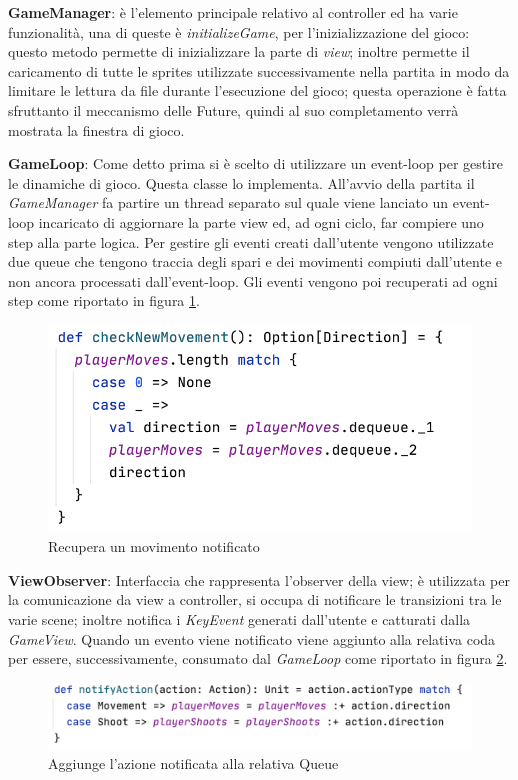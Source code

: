  \textbf{GameManager}: è l'elemento principale relativo al controller ed ha varie funzionalità, una di queste è \textit{initializeGame}, per l'inizializzazione del gioco: questo metodo permette di inizializzare la parte di \textit{view}; inoltre permette il caricamento di tutte le sprites utilizzate successivamente nella partita in modo da limitare le lettura da file durante l'esecuzione del gioco; questa operazione è fatta sfruttanto il meccanismo delle Future, quindi al suo completamento verrà mostrata la finestra di gioco.

\textbf{GameLoop}: Come detto prima si è scelto di utilizzare un event-loop per gestire le dinamiche di gioco. Questa classe lo implementa. All'avvio della partita il \textit{GameManager} fa partire un thread separato sul quale viene lanciato un event-loop incaricato di aggiornare la parte view ed, ad ogni ciclo, far compiere uno step alla parte logica. 
Per gestire gli eventi creati dall'utente vengono utilizzate due queue che tengono traccia degli spari e dei movimenti compiuti dall'utente e non ancora processati dall'event-loop. Gli eventi vengono poi recuperati ad ogni step come riportato in figura \ref{checknewMovement}.

\begin{figure}[H]
  \includegraphics[width=13cm]{report/res/checkNewMovement.png}
  \caption{Recupera un movimento notificato}
  \label{checknewMovement}
\end{figure}
\textbf{ViewObserver}: Interfaccia che rappresenta l'observer della view; è utilizzata per la comunicazione da view a controller, si occupa di notificare le transizioni tra le varie scene; inoltre notifica i \textit{KeyEvent} generati dall'utente e catturati dalla \textit{GameView}. Quando un evento viene notificato viene aggiunto alla relativa coda per essere, successivamente, consumato dal \textit{GameLoop} come riportato in figura \ref{notifyAction}.
\begin{figure}[H]
  \includegraphics[width=15cm]{report/res/notifyAction.png}
  \caption{Aggiunge l'azione notificata alla relativa Queue}
  \label{notifyAction}
\end{figure}

